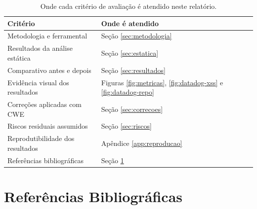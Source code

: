 \documentclass[12pt,a4paper]{article}
\begin{document}
\begin{table}[H]
\centering
\caption{Onde cada critério de avaliação é atendido neste relatório.}
\begin{tabularx}{\textwidth}{@{}lXl@{}}
\toprule
\textbf{Critério} & \textbf{Onde é atendido} \\
\midrule
Metodologia e ferramental              & Seção \ref{sec:metodologia} \\
Resultados da análise estática          & Seção \ref{sec:estatica} \\
Comparativo antes e depois              & Seção \ref{sec:resultados} \\
Evidência visual dos resultados        & Figuras \ref{fig:metricas}, \ref{fig:datadog-xss} e \ref{fig:datadog-repo} \\
Correções aplicadas com CWE            & Seção \ref{sec:correcoes} \\
Riscos residuais assumidos             & Seção \ref{sec:riscos} \\
Reprodutibilidade dos resultados       & Apêndice \ref{app:reproducao} \\
Referências bibliográficas              & Seção \ref{sec:referencias} \\
\bottomrule
\end{tabularx}
\end{table}

\section{Referências Bibliográficas}\label{sec:referencias}
\end{document}
